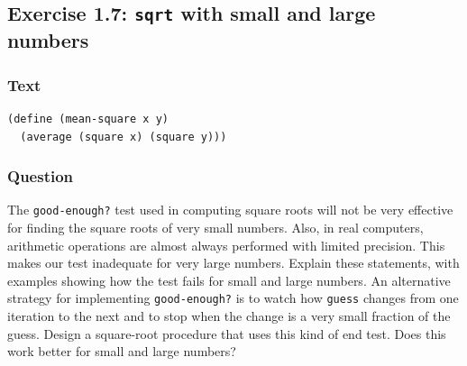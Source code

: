 \documentclass[final,fleqn,titlepage,twoside]{article}
\begin{document}
\subsection{Exercise 1.7: \texttt{sqrt} with small and large numbers}
\label{sec:org9243f23}
\subsubsection{Text}
\label{sec:orgb4501a3}
\begin{verbatim}
(define (mean-square x y)
  (average (square x) (square y)))
\end{verbatim}

\subsubsection{Question}
\label{sec:orgf0fd211}
The \texttt{good-enough?} test used in computing square roots will not be
very effective for finding the square roots of very small numbers. Also, in real
computers, arithmetic operations are almost always performed with limited
precision. This makes our test inadequate for very large numbers. Explain these
statements, with examples showing how the test fails for small and large
numbers. An alternative strategy for implementing \texttt{good-enough?} is to
watch how \texttt{guess} changes from one iteration to the next and to stop
when the change is a very small fraction of the guess. Design a square-root
procedure that uses this kind of end test. Does this work better for small and
large numbers?
\end{document}
